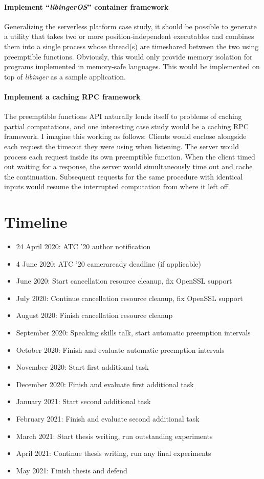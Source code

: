 \documentclass[12pt,letterpaper,openright]{report}
\begin{document}
\paragraph{Implement ``\textit{libingerOS}'' container framework}
Generalizing the serverless platform case study, it should be possible to generate a
utility that takes two or more position-independent executables and combines them
into a single process whose thread(s) are timeshared between the two using
preemptible functions.  Obviously, this would only provide memory isolation for
programs implemented in memory-safe languages.  This would be implemented on top of
\textit{libinger} as a sample application.

\paragraph{Implement a caching RPC framework}
The preemptible functions API naturally lends itself to problems of caching partial
computations, and one interesting case study would be a caching RPC framework.  I
imagine this working as follows:  Clients would enclose alongside each request the
timeout they were using when listening.  The server would process each request inside
its own preemptible function.  When the client timed out waiting for a response, the
server would simultaneously time out and cache the continuation.  Subsequent requests
for the same procedure with identical inputs would resume the interrupted computation
from where it left off.


\section{Timeline}

\begin{itemize}
\item 24 April 2020: ATC '20 author notification
\item 4 June 2020: ATC '20 cameraready deadline (if applicable)
\item June 2020: Start cancellation resource cleanup, fix OpenSSL support
\item July 2020: Continue cancellation resource cleanup, fix OpenSSL support
\item August 2020: Finish cancellation resource cleanup
\item September 2020: Speaking skills talk, start automatic preemption intervals
\item October 2020: Finish and evaluate automatic preemption intervals
\item November 2020: Start first additional task
\item December 2020: Finish and evaluate first additional task
\item January 2021: Start second additional task
\item February 2021: Finish and evaluate second additional task
\item March 2021: Start thesis writing, run outstanding experiments
\item April 2021: Continue thesis writing, run any final experiments
\item May 2021: Finish thesis and defend
\end{itemize}


\newpage
{}

\end{document}
